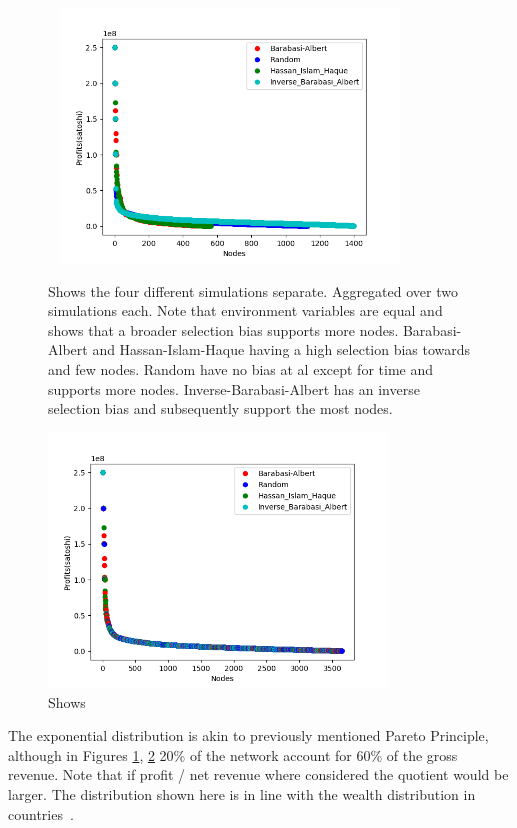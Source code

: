 \begin{figure}[!htb]
	\hspace*{-0.7cm}\
	\centering
	\includegraphics[width=9cm]{images/wealth_distribution_path.png}
	\caption{ Shows the four different simulations separate. Aggregated over two simulations each. Note that environment variables are equal and shows that a broader selection bias supports more nodes. Barabasi-Albert and Hassan-Islam-Haque having a high selection bias towards and few nodes. Random have no bias at al except for time and supports more nodes. Inverse-Barabasi-Albert has an inverse selection bias and subsequently support the most nodes. 
	}
	\label{fig:path}

\end{figure}

\begin{figure}[!htb]
	\vspace{-3cm}
	\centering
	\includegraphics[width=9cm]{images/wealth_distribution_same.png}
	\caption{ Shows
	}
	\label{fig:same}
	\hspace*{2mm} 
\end{figure}

The exponential distribution is akin to previously mentioned Pareto Principle, although in Figures \ref{fig:path}, \ref{fig:same} 20\% of the network account for 60\% of the gross revenue. Note that if profit / net revenue where considered the quotient would be larger. The distribution shown here is in line with the wealth distribution in countries~\cite{credit:swiss:distribution}.

